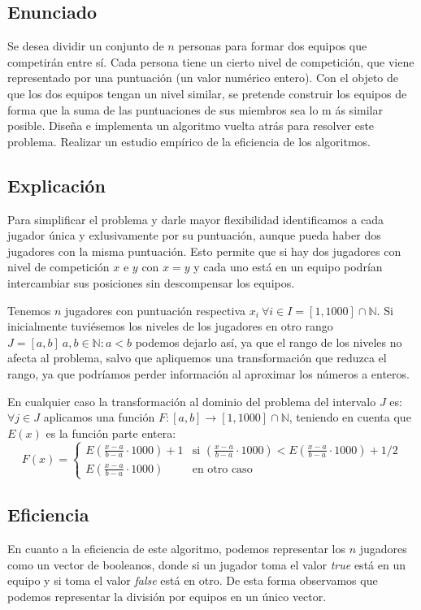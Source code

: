 \subsection{Enunciado}
Se desea dividir un conjunto de $n$ personas para formar dos equipos que competirán entre sí.
Cada persona tiene un cierto nivel de competición, que viene representado por una puntuación
(un valor numérico entero). Con el objeto de que los dos equipos tengan un nivel similar,
se pretende construir los equipos de forma que la suma de las puntuaciones de sus miembros
sea lo m ás similar posible. Diseña e implementa un algoritmo vuelta atrás para resolver este
problema. Realizar un estudio empírico de la eficiencia de los algoritmos.

\subsection{Explicación}
Para simplificar el problema y darle mayor flexibilidad identificamos a cada jugador única y exlusivamente por su puntuación, aunque pueda haber dos jugadores con la misma puntuación. 
Esto permite que si hay dos jugadores con nivel de competición $x$ e $y$ con $x=y$ y cada uno está en un equipo podrían intercambiar sus posiciones sin descompensar los equipos.

Tenemos $n$ jugadores con puntuación respectiva $x_i\ \forall i\in I=[1, 1000]\cap \mathbb{N}$. 
Si inicialmente tuviésemos los niveles de los jugadores en otro rango $J=[a, b]\ a,b\in\mathbb{N}: a<b$ podemos dejarlo así, ya que el rango de los niveles no afecta al problema, salvo que apliquemos una transformación que reduzca el rango, ya que podríamos perder información al aproximar los números a enteros.

En cualquier caso la transformación al dominio del problema del intervalo $J$ es: $\forall j\in J$ aplicamos una función $F:[a,b] \rightarrow [1,1000]\cap\mathbb{N}$, teniendo en cuenta que $E(x)$ es la función parte entera:
\[F(x) = \left\{
	\begin{matrix}
		E\left( \frac{x-a}{b-a}\cdot 1000 \right)+1  & 
		\mbox{si } \left( \frac{x-a}{b-a}\cdot 1000 \right) < 
					E\left( \frac{x-a}{b-a}\cdot 1000 \right) + 1/2

	 \\	E\left( \frac{x-a}{b-a}\cdot 1000 \right)    & 
	 	\mbox{en otro caso}
	\end{matrix}
	\right.
\]

\subsection{Eficiencia}
En cuanto a la eficiencia de este algoritmo, podemos representar los $n$ jugadores como un vector de booleanos, donde si un jugador toma el valor \textit{true} está en un equipo y si toma el valor \textit{false} está en otro. De esta forma observamos que podemos representar la división por equipos en un único vector.

